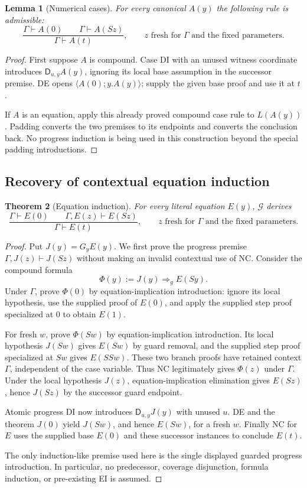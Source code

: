 \documentclass[11pt,letterpaper]{article}
\newtheorem{theorem}{Theorem}[section]
\newtheorem{lemma}[theorem]{Lemma}
\theoremstyle{definition}
\begin{document}
\begin{lemma}[Numerical cases]
For every canonical $A(y)$ the following rule is admissible:
\[
 \frac{\Gamma\vdash A(0)\qquad\Gamma\vdash A(Sz)}
      {\Gamma\vdash A(t)},
 \qquad z\text{ fresh for }\Gamma\text{ and the fixed parameters}.
 \tag{NC}\label{eq:guarded-cases}
\]
\end{lemma}
\begin{proof}
First suppose $A$ is compound.  Case DI with an unused witness coordinate
introduces $\mathsf D_{u,y}A(y)$, ignoring its local base assumption in
the successor premise.  DE opens $\langle A(0);y.A(y)\rangle$; supply
the given base proof and use it at $t$.

If $A$ is an equation, apply this already proved compound case rule to
$L(A(y))$.  Padding converts the two premises to its endpoints and
converts the conclusion back.  No progress induction is being used in
this construction beyond the special padding introductions.
\end{proof}

\subsection{Recovery of contextual equation induction}

\begin{theorem}[Equation induction]
For every literal equation $E(y)$, $\mathcal G$ derives
\[
 \frac{\Gamma\vdash E(0)\qquad\Gamma,E(z)\vdash E(Sz)}
      {\Gamma\vdash E(t)},
 \qquad z\text{ fresh for }\Gamma\text{ and the fixed parameters}.
 \tag{EI}\label{eq:guarded-ei}
\]
\end{theorem}
\begin{proof}
Put $J(y)=G_yE(y)$.  We first prove the progress premise
$\Gamma,J(z)\vdash J(Sz)$ without making an invalid contextual use of
NC.  Consider the compound formula
\[
 \Phi(y):=J(y)\Rightarrow_g E(Sy).
\]
Under $\Gamma$, prove $\Phi(0)$ by equation-implication introduction:
ignore its local hypothesis, use the supplied proof of $E(0)$, and
apply the supplied step proof specialized at $0$ to obtain $E(1)$.

For fresh $w$, prove $\Phi(Sw)$ by equation-implication introduction.
Its local hypothesis $J(Sw)$ gives $E(Sw)$ by guard removal, and the
supplied step proof specialized at $Sw$ gives $E(SSw)$.
These two branch proofs have retained context $\Gamma$, independent
of the case variable.  Thus NC legitimately gives $\Phi(z)$ under
$\Gamma$.  Under the local hypothesis $J(z)$, equation-implication
elimination gives $E(Sz)$, hence $J(Sz)$ by the successor guard endpoint.

Atomic progress DI now introduces $\mathsf D_{u,y}J(y)$ with unused
$u$.  DE and the theorem $J(0)$ yield $J(Sw)$, and hence $E(Sw)$, for
a fresh $w$.  Finally NC for $E$ uses the supplied base $E(0)$ and
these successor instances to conclude $E(t)$.

The only induction-like premise used here is the single displayed
guarded progress introduction.  In particular, no predecessor,
coverage disjunction, formula induction, or pre-existing EI is assumed.
\end{proof}
\end{document}
